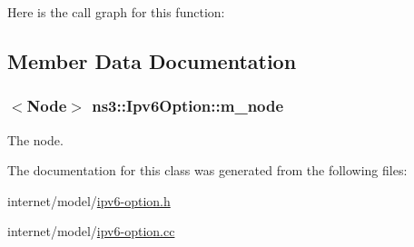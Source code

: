 Here is the call graph for this function\+:




\subsection{Member Data Documentation}
\subsubsection[{\texorpdfstring{m\+\_\+node}{m_node}}]{$<${\bf Node}$>$ ns3\+::\+Ipv6\+Option\+::m\+\_\+node\hspace{0.3cm}{\ttfamily [private]}}\hypertarget{classns3_1_1Ipv6Option_a97a08b897f64f5c5fc7ffe6c8cb316d9}{}\label{classns3_1_1Ipv6Option_a97a08b897f64f5c5fc7ffe6c8cb316d9}


The node. 



The documentation for this class was generated from the following files\+:\begin{DoxyCompactItemize}
\item 
internet/model/\hyperlink{ipv6-option_8h}{ipv6-\/option.\+h}\item 
internet/model/\hyperlink{ipv6-option_8cc}{ipv6-\/option.\+cc}\end{DoxyCompactItemize}
